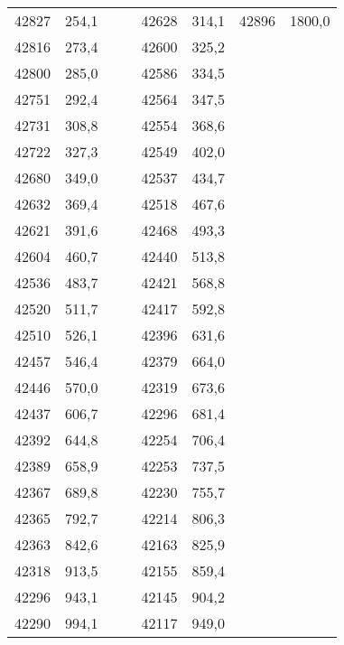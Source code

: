 \documentclass[11pt]{article}
\begin{document}
{{\begin{tabular}{|c|c|c|c|c|c|c|c|}
            \cline{1-2} \cline{5-8} 
            42827 & 254,1 &  &  & 42628 & 314,1 & \multicolumn{1}{c|}{42896} & \multicolumn{1}{c|}{1800,0}\tabularnewline
            \cline{1-2} \cline{5-8} 
            42816 & 273,4 &  &  & 42600 & 325,2 &  & \tabularnewline
            \cline{1-2} \cline{5-6} 
            42800 & 285,0 &  &  & 42586 & 334,5 &  & \tabularnewline
            \cline{1-2} \cline{5-6} 
            42751 & 292,4 &  &  & 42564 & 347,5 &  & \tabularnewline
            \cline{1-2} \cline{5-6} 
            42731 & 308,8 &  &  & 42554 & 368,6 &  & \tabularnewline
            \cline{1-2} \cline{5-6} 
            42722 & 327,3 &  &  & 42549 & 402,0 &  & \tabularnewline
            \cline{1-2} \cline{5-6} 
            42680 & 349,0 &  &  & 42537 & 434,7 &  & \tabularnewline
            \cline{1-2} \cline{5-6} 
            42632 & 369,4 &  &  & 42518 & 467,6 &  & \tabularnewline
            \cline{1-2} \cline{5-6} 
            42621 & 391,6 &  &  & 42468 & 493,3 &  & \tabularnewline
            \cline{1-2} \cline{5-6} 
            42604 & 460,7 &  &  & 42440 & 513,8 &  & \tabularnewline
            \cline{1-2} \cline{5-6} 
            42536 & 483,7 &  &  & 42421 & 568,8 &  & \tabularnewline
            \cline{1-2} \cline{5-6} 
            42520 & 511,7 &  &  & 42417 & 592,8 &  & \tabularnewline
            \cline{1-2} \cline{5-6} 
            42510 & 526,1 &  &  & 42396 & 631,6 &  & \tabularnewline
            \cline{1-2} \cline{5-6} 
            42457 & 546,4 &  &  & 42379 & 664,0 &  & \tabularnewline
            \cline{1-2} \cline{5-6} 
            42446 & 570,0 &  &  & 42319 & 673,6 &  & \tabularnewline
            \cline{1-2} \cline{5-6} 
            42437 & 606,7 &  &  & 42296 & 681,4 &  & \tabularnewline
            \cline{1-2} \cline{5-6} 
            42392 & 644,8 &  &  & 42254 & 706,4 &  & \tabularnewline
            \cline{1-2} \cline{5-6} 
            42389 & 658,9 &  &  & 42253 & 737,5 &  & \tabularnewline
            \cline{1-2} \cline{5-6} 
            42367 & 689,8 &  &  & 42230 & 755,7 &  & \tabularnewline
            \cline{1-2} \cline{5-6} 
            42365 & 792,7 &  &  & 42214 & 806,3 &  & \tabularnewline
            \cline{1-2} \cline{5-6} 
            42363 & 842,6 &  &  & 42163 & 825,9 &  & \tabularnewline
            \cline{1-2} \cline{5-6} 
            42318 & 913,5 &  &  & 42155 & 859,4 &  & \tabularnewline
            \cline{1-2} \cline{5-6} 
            42296 & 943,1 &  &  & 42145 & 904,2 &  & \tabularnewline
            \cline{1-2} \cline{5-6} 
            42290 & 994,1 &  &  & 42117 & 949,0 &  & \tabularnewline
            \cline{1-2} \cline{5-6} 

\end{tabular}}}
\end{document}
